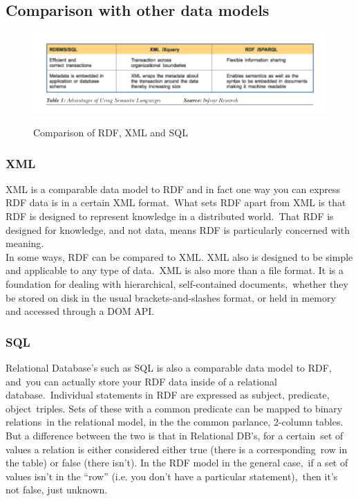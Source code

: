  \subsection{Comparison with other data models}

  \begin{figure}[ht!]
    \centering
    \includegraphics[scale=0.5]{sqlrdf.png}
    \caption{Comparison of RDF, XML and SQL}
    \citep[Fig.~1]{parachuri2008role}
    \label{fig:rdfcomp}
  \end{figure}  

  \subsubsection{XML}
  XML is a comparable data model to RDF and in fact one way you can express RDF data is in a certain XML format.\
  What sets RDF apart from XML is that RDF is designed to represent knowledge in a distributed world.\
  That RDF is designed for knowledge, and not data, means RDF is particularly concerned with meaning.\\

  \noindent In some ways, RDF can be compared to XML. XML also is designed to be simple and applicable to any type of data.\
  XML is also more than a file format. It is a foundation for dealing with hierarchical, self-contained documents,\
  whether they be stored on disk in the usual brackets-and-slashes format, or held in memory and accessed through a DOM API.\
  \citep{_rdf_about_2013}\

  \subsubsection{SQL}
  Relational Database’s such as SQL is also a comparable data model to RDF, and\
  you can actually store your RDF data inside of a relational database.\
  Individual statements in RDF are expressed as subject, predicate, object\ 
  triples. Sets of these with a common predicate can be mapped to binary relations\
  in the relational model, in the the common parlance, 2-column tables.\\

  \noindent But a difference between the two is that in Relational DB's, for a certain\
  set of values a relation is either considered either true (there is a corresponding\
  row in the table) or false (there isn't). In the RDF model in the general case,\
  if a set of values isn't in the ``row'' (i.e. you don't have a particular statement),\
  then it's not false, just unknown. \citep{_rdf_comparison_2013}\
